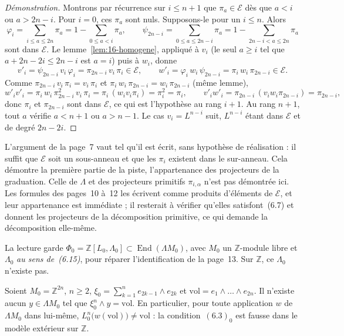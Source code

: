 \begin{proof}[Démonstration]
Montrons par récurrence sur $i \leqslant n + 1$ que $\pi_a \in \mathcal E$ dès que $a < i$ ou $a > 2n - i$. Pour $i = 0$, ces $\pi_a$ sont nuls. Supposons-le pour un $i \leqslant n$. Alors
\[
\varphi_i = \sum_{i \leqslant a \leqslant 2n} \pi_a = 1 - \sum_{0 \leqslant a < i} \pi_a,
\qquad
\psi_{2n-i} = \sum_{0 \leqslant a \leqslant 2n-i} \pi_a = 1 - \sum_{2n-i < a \leqslant 2n} \pi_a
\]
sont dans $\mathcal E$. Le lemme~\ref{lem:16-homogene}, appliqué à $v_i$ (le seul $a \geqslant i$ tel que $a + 2n - 2i \leqslant 2n - i$ est $a = i$) puis à $w_i$, donne
\[
v'_i = \psi_{2n-i}\, v_i\, \varphi_i = \pi_{2n-i}\, v_i\, \pi_i \in \mathcal E,
\qquad
w'_i = \varphi_i\, w_i\, \psi_{2n-i} = \pi_i\, w_i\, \pi_{2n-i} \in \mathcal E.
\]
Comme $\pi_{2n-i}\, v_i\, \pi_i = v_i\, \pi_i$ et $\pi_i\, w_i\, \pi_{2n-i} = w_i\, \pi_{2n-i}$ (même lemme),
\[
w'_i v'_i = \pi_i\, w_i\, \pi_{2n-i}^2\, v_i\, \pi_i = \pi_i\, (w_i v_i \pi_i) = \pi_i^2 = \pi_i,
\qquad
v'_i w'_i = \pi_{2n-i}\, (v_i w_i \pi_{2n-i}) = \pi_{2n-i},
\]
donc $\pi_i$ et $\pi_{2n-i}$ sont dans $\mathcal E$, ce qui est l'hypothèse au rang $i+1$. Au rang $n + 1$, tout $a$ vérifie $a < n + 1$ ou $a > n - 1$. Le cas $v_i = L^{n-i}$ suit, $L^{n-i}$ étant dans $\mathcal E$ et de degré $2n - 2i$.
\end{proof}

\begin{remarque}
L'argument de la page~7 vaut tel qu'il est écrit, sans hypothèse de réalisation : il suffit que $\mathcal E$ soit un sous-anneau et que les $\pi_i$ existent dans le sur-anneau. Cela démontre la première partie de la piste, l'appartenance des projecteurs de la graduation. Celle de $\Lambda$ et des projecteurs primitifs $\pi_{i,\alpha}$ n'est pas démontrée ici. Les formules des pages~10 à~12 les écrivent comme produits d'éléments de $\mathcal E$, et leur appartenance est immédiate ; il resterait à vérifier qu'elles satisfont~(6.7) et donnent les projecteurs de la décomposition primitive, ce qui demande la décomposition elle-même.
\end{remarque}

La lecture garde $\Phi_0 = \mathbb Z[L_0, \Lambda_0] \subset \operatorname{End}(\Lambda M_0)$, avec $M_0$ un $\mathbb Z$-module libre et $\Lambda_0$ \emph{au sens de~(6.15)}, pour réparer l'identification de la page~13. Sur $\mathbb Z$, ce $\Lambda_0$ n'existe pas.

\begin{encadre}
\begin{contrexemple}
Soient $M_0 = \mathbb Z^{2n}$, $n \geqslant 2$, $\xi_0 = \sum_{k=1}^{n} e_{2k-1} \wedge e_{2k}$ et $\mathrm{vol} = e_1 \wedge \dots \wedge e_{2n}$. Il n'existe aucun $y \in \Lambda M_0$ tel que $\xi_0^n \wedge y = \mathrm{vol}$. En particulier, pour toute application $w$ de $\Lambda M_0$ dans lui-même, $L_0^n\bigl(w(\mathrm{vol})\bigr) \neq \mathrm{vol}$ : la condition~$(6.3)_0$ est fausse dans le modèle extérieur sur $\mathbb Z$.
\end{contrexemple}
\end{encadre}

